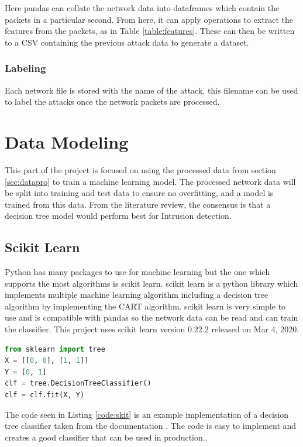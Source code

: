 Here pandas can collate the network data into dataframes which contain the packets in a particular second. From here, it can apply operations to extract the features from the packets, as in Table \ref{table:features}. These can then be written to a CSV containing the previous attack data to generate a dataset.
\subsubsection{Labeling}
Each network file is stored with the name of the attack, this filename can be used to label the attacks once the network packets are processed.
\section{Data Modeling}
This part of the project is focused on using the processed data from section \ref{sec:datapro} to train a machine learning model. The processed network data will be split into training and test data to ensure no overfitting, and a model is trained from this data. From the literature review, the consensus is that a decision tree model would perform best for Intrusion detection.
\subsection{Scikit Learn}
Python has many packages to use for machine learning but the one which supports the most algorithms is scikit learn. scikit learn is a python library which implements multiple machine learning algorithm including a decision tree algorithm by implementing the CART algorithm. scikit learn is very simple to use and is compatible with pandas so the network data can be read and can train the classifier. This project uses scikit learn version 0.22.2 released on Mar 4, 2020.
\begin{lstlisting}[language = python, caption = Decision Tree scikit-learn Example, label=code:skit]
from sklearn import tree
X = [[0, 0], [1, 1]]
Y = [0, 1]
clf = tree.DecisionTreeClassifier()
clf = clf.fit(X, Y)
\end{lstlisting}
The code seen in Listing \ref{code:skit} is an example implementation of a decision tree classifier taken from the documentation \cite{scikit}. The code is easy to implement and creates a good classifier that can be used in production.\cite{scikit_prod}. 

